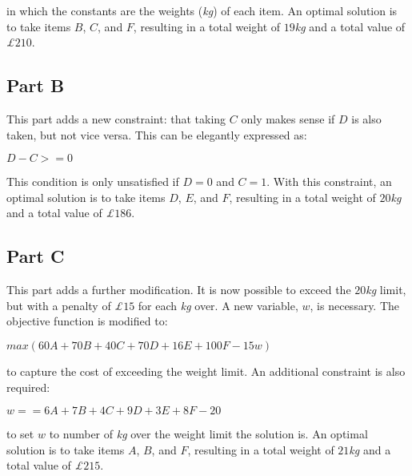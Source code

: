 \documentclass[11pt]{article} %
\begin{document}
in which the constants are the weights (\textit{kg}) of each item. An optimal solution is to take items $B$, $C$, and $F$, resulting in a total weight of $19$\textit{kg} and a total value of \textit{£}$210$.

\subsection*{Part B}

This part adds a new constraint:  that taking $C$ only makes sense if $D$ is also taken, but not vice versa. This can be elegantly expressed as:

\begin{center}

$D - C >= 0$

\end{center}

This condition is only unsatisfied if $D = 0$ and $C = 1$. With this constraint, an optimal solution is to take items $D$, $E$, and $F$, resulting in a total weight of $20$\textit{kg} and a total value of \textit{£}$186$.

\subsection*{Part C}

This part adds a further modification. It is now possible to exceed the $20$\textit{kg} limit, but with a penalty of \textit{£}$15$ for each \textit{kg} over. A new variable, $w$, is necessary. The objective function is modified to:

\begin{center}

$max (60A + 70B + 40C + 70D + 16E + 100F - 15w)$

\end{center}

to capture the cost of exceeding the weight limit. An additional constraint is also required:

\begin{center}

$w == 6A + 7B + 4C + 9D + 3E + 8F - 20$

\end{center}

to set $w$ to number of \textit{kg} over the weight limit the solution is.
An optimal solution is to take items $A$, $B$, and $F$, resulting in a total weight of $21$\textit{kg} and a total value of \textit{£}$215$.
\end{document}
